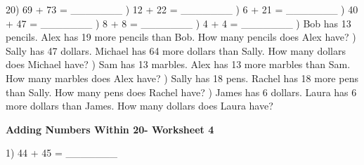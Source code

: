 \documentclass{article}%
\begin{document}
20) 69 + 73 = \_\_\_\_\_\_\_%
\newline%
\newline%
) 12 + 22 = \_\_\_\_\_\_\_%
\newline%
\newline%
) 6 + 21 = \_\_\_\_\_\_\_%
\newline%
\newline%
) 40 + 47 = \_\_\_\_\_\_\_%
\newline%
\newline%
) 8 + 8 = \_\_\_\_\_\_\_%
\newline%
\newline%
) 4 + 4 = \_\_\_\_\_\_\_%
\newline%
\newline%
) Bob has 13 pencils. Alex has 19 more pencils than Bob. How many pencils does Alex have?%
\newline%
\newline%
) Sally has 47 dollars. Michael has 64 more dollars than Sally. How many dollars does Michael have?%
\newline%
\newline%
) Sam has 13 marbles. Alex has 13 more marbles than Sam. How many marbles does Alex have?%
\newline%
\newline%
) Sally has 18 pens. Rachel has 18 more pens than Sally. How many pens does Rachel have?%
\newline%
\newline%
) James has 6 dollars. Laura has 6 more dollars than James. How many dollars does Laura have?%
\newline%
\newline%
\newline%
\pagebreak%
\large%
\begin{center}%
\textbf{Adding Numbers Within 20- Worksheet 4}%
\newline%
\end{center} \normalsize%
1) 44 + 45 = \_\_\_\_\_\_\_%
\newline%
\end{document}
